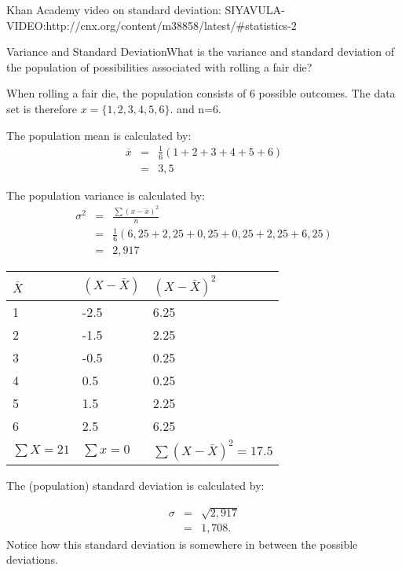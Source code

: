 Khan Academy video on standard deviation: SIYAVULA-VIDEO:http://cnx.org/content/m38858/latest/#statistics-2
\begin{wex}{Variance and Standard Deviation}{What is the variance and standard deviation of the population of possibilities associated with rolling a fair die?}
{
When rolling a fair die, the population consists of 6 possible outcomes. The data set is therefore $x=\{1,2,3,4,5,6\}$. and n=6.

The population mean is calculated by:
\begin{eqnarray*}
\bar{x} &=& \frac{1}{6}(1+2+3+4+5+6)\\
&=& 3,5
\end{eqnarray*}

The population variance is calculated by:
\begin{eqnarray*}
\sigma^2&=& \frac{\sum(x-\bar{x})^2}{n}\\
&=&\frac{1}{6} (6,25+2,25+0,25+0,25+2,25+6,25)\\
&=& 2,917
\end{eqnarray*}

\begin{center}
\begin{tabular}{|l|l|l|}
\hline
$\bar{X}$ & $(X - \bar{X})$ & $(X - \bar{X})^2$  \\
\hline
1 & -2.5 & 6.25 \\
2 & -1.5 & 2.25 \\
3 & -0.5 & 0.25 \\
4 & 0.5  & 0.25 \\
5 & 1.5  & 2.25 \\
6 & 2.5  & 6.25 \\
\hline
$\sum{X} = 21$ & $\sum{x} = 0$ & $\sum{(X  - \bar{X})^2} = 17.5$ \\
\hline
\end{tabular}
\end{center}

The (population) standard deviation is calculated by:

\begin{eqnarray*}
\sigma &=& \sqrt{2,917} \\
&=& 1,708.
\end{eqnarray*}
Notice how this standard deviation is somewhere in between the possible deviations.}
\end{wex}

